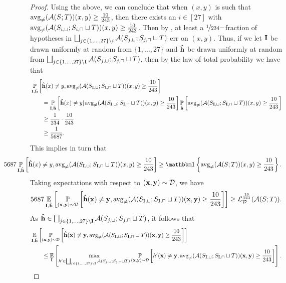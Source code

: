 \begin{proof}
Using the above, we can conclude that when $(x,y)$ is such that $\operatorname{\mathrm{avg}_{\not=}}(\mathcal{A}(S;T))(x,y)\geq \frac{10}{243}$, then there exists an $ i\in [27]$ with $\operatorname{\mathrm{avg}_{\not=}}(\mathcal{A}(S_{i,\sqcup}; S_{i,\sqcap}\sqcup T))(x,y) \geq \frac{10}{243}$. Then by , at least a $\nicefrac{1}{234}-$fraction of hypotheses in $ \bigsqcup_{j\in \{1,\ldots,27  \} \backslash i}\mathcal{A}(S_{j,\sqcup}; S_{j,\sqcap} \sqcup T) $ err on $ (x,y).$ Thus, if we let $ \mathbf{I} $ be drawn uniformly at random from $ \{1,\ldots,27  \} $ and $ \mathbf{\hat{h}} $ be drawn uniformly at random from $ \bigsqcup_{j\in \{1,\ldots,27  \} \backslash \mathbf{I}}\mathcal{A}(S_{j,\sqcup}; S_{j,\sqcap} \sqcup T) $, then by the law of total probability we have that  
\begin{align*}
 &\operatorname*{\mathbb{P}}_{\mathbf{I},\mathbf{\hat{h}}}\left[\mathbf{\hat{h}}(x)\not=y,\operatorname{\mathrm{avg}_{\not=}}(\mathcal{A}(S_{\mathbf{I},\sqcup}; S_{\mathbf{I},\sqcap}\sqcup T))(x,y) \geq \frac{10}{243}\right] 
 \\
 & \qquad = \operatorname*{\mathbb{P}}_{\mathbf{I},\mathbf{\hat{h}}}\left[\mathbf{\hat{h}}(x)\not=y| \operatorname{\mathrm{avg}_{\not=}}(\mathcal{A}(S_{\mathbf{I},\sqcup}; S_{\mathbf{I},\sqcap}\sqcup T))(x,y) \geq \frac{10}{243}\right]\operatorname*{\mathbb{P}}_{\mathbf{\hat{h}}}\left[\operatorname{\mathrm{avg}_{\not=}}(\mathcal{A}(S_{\mathbf{I},\sqcup}; S_{\mathbf{I},\sqcap}\sqcup T))(x,y)\geq \frac{10}{243}\right]
 \\
 &\qquad \geq \frac{1}{234} \cdot \frac{10}{243} \\ 
 &\qquad \geq \frac{1}{5687}. 
\end{align*}
This implies in turn that 
\begin{align}\label{eq:relationerror1}
\hspace{-1.5 cm} 5687\p_{\rI,\rh}\left[\rh(x)\not=y,\avg(\erm(S_{\rI,\sqcup}; S_{\rI,\sqcap}\sqcup T))(x,y)\geq \frac{10}{243}\right]\geq \ind \left \{\avg(\erm(S;T))(x,y) \geq \frac{10}{243} \right \}.  
\end{align}
Taking expectations with respect to $(\mathbf{x},\mathbf{y})\sim \mathcal{D} $, we have
\begin{align*}
5687\operatorname*{\mathbb{E}}_{\mathbf{I},\mathbf{\hat{h}}}\left[\operatorname*{\mathbb{P}}_{(\mathbf{x},\mathbf{y})\sim\mathcal{D}}\left[\mathbf{\hat{h}}(\mathbf{x})\not=\mathbf{y},\operatorname{\mathrm{avg}_{\not=}}(\mathcal{A}(S_{\mathbf{I},\sqcup}; S_{\mathbf{I},\sqcap}\sqcup T))(\mathbf{x},\mathbf{y}) \geq \frac{10}{243} \right]\right]\geq \operatorname{\mathcal{L}}_{\mathcal{D}}^{\frac{10}{243}} (\mathcal{A}(S;T)).
\end{align*}
As $\mathbf{\hat{h}}\in \bigsqcup_{j\in \{1,\ldots,27  \} \backslash \mathbf{I}}\mathcal{A}(S_{j,\sqcup}; S_{j,\sqcap} \sqcup T)$,  it follows that 
\begin{align}\label{eq:relationerror2}
&\e_{\rI,\rh}\left[\p_{(\rx,\ry)\sim\cD}\left[\rh(\rx)\not=\ry,\avg(\erm(S_{\rI,\sqcup}; S_{\rI,\sqcap}\sqcup T))(\rx,\ry) \geq \frac{10}{243} \right]\right] \\
&\qquad \leq \e_{\rI}\left[\max_{h'\in  \bigsqcup_{j\in \{1,\ldots,27  \} \backslash \rI}\erm(S_{j,\sqcup}; S_{j,\sqcap} \sqcup T) }\p_{(\rx,\ry)\sim\cD}\left[h'(\rx)\not=\ry,\avg(\erm(S_{\rI,\sqcup}; S_{\rI,\sqcap}\sqcup T))(\rx,\ry) \geq \frac{10}{243}  \right]\right]. \nonumber

\end{align}
\end{proof}
